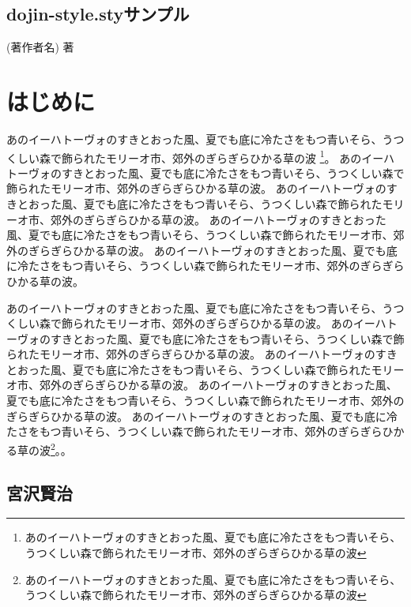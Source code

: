 \documentclass[b5j]{jsbook}
\begin{document}
\frontmatter

\begin{titlepage}
\chapter*{dojin-style.styサンプル}
\thispagestyle{empty}
\begin{flushright}
\vfill
{\textsf{\LARGE (著作者名) 著}}
\end{flushright}
\end{titlepage}

\chapter*{はじめに}

あのイーハトーヴォのすきとおった風、夏でも底に冷たさをもつ青いそら、うつくしい森で飾られたモリーオ市、郊外のぎらぎらひかる草の波
\footnote{あのイーハトーヴォのすきとおった風、夏でも底に冷たさをもつ青いそら、うつくしい森で飾られたモリーオ市、郊外のぎらぎらひかる草の波}。
あのイーハトーヴォのすきとおった風、夏でも底に冷たさをもつ青いそら、うつくしい森で飾られたモリーオ市、郊外のぎらぎらひかる草の波。
あのイーハトーヴォのすきとおった風、夏でも底に冷たさをもつ青いそら、うつくしい森で飾られたモリーオ市、郊外のぎらぎらひかる草の波。
あのイーハトーヴォのすきとおった風、夏でも底に冷たさをもつ青いそら、うつくしい森で飾られたモリーオ市、郊外のぎらぎらひかる草の波。
あのイーハトーヴォのすきとおった風、夏でも底に冷たさをもつ青いそら、うつくしい森で飾られたモリーオ市、郊外のぎらぎらひかる草の波。

あのイーハトーヴォのすきとおった風、夏でも底に冷たさをもつ青いそら、うつくしい森で飾られたモリーオ市、郊外のぎらぎらひかる草の波。
あのイーハトーヴォのすきとおった風、夏でも底に冷たさをもつ青いそら、うつくしい森で飾られたモリーオ市、郊外のぎらぎらひかる草の波。
あのイーハトーヴォのすきとおった風、夏でも底に冷たさをもつ青いそら、うつくしい森で飾られたモリーオ市、郊外のぎらぎらひかる草の波。
あのイーハトーヴォのすきとおった風、夏でも底に冷たさをもつ青いそら、うつくしい森で飾られたモリーオ市、郊外のぎらぎらひかる草の波。
あのイーハトーヴォのすきとおった風、夏でも底に冷たさをもつ青いそら、うつくしい森で飾られたモリーオ市、郊外のぎらぎらひかる草の波\footnote{あのイーハトーヴォのすきとおった風、夏でも底に冷たさをもつ青いそら、うつくしい森で飾られたモリーオ市、郊外のぎらぎらひかる草の波}。。

\section*{宮沢賢治}
\end{document}
